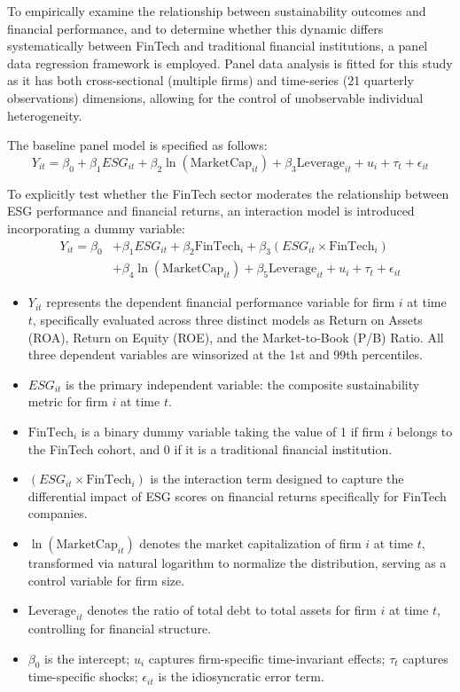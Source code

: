 \documentclass[12pt]{article}
\begin{document}
To empirically examine the relationship between sustainability outcomes and financial performance, and to determine whether this dynamic differs systematically between FinTech and traditional financial institutions, a panel data regression framework is employed. Panel data analysis is fitted for this study as it has both cross-sectional (multiple firms) and time-series (21 quarterly observations) dimensions, allowing for the control of unobservable individual heterogeneity.

The baseline panel model is specified as follows:
\begin{equation}
Y_{it} = \beta_0 + \beta_1 \textit{ESG}_{it} + \beta_2 \ln(\text{MarketCap}_{it}) + \beta_3 \text{Leverage}_{it} + u_i + \tau_t + \epsilon_{it}
\end{equation}

To explicitly test whether the FinTech sector moderates the relationship between ESG performance and financial returns, an interaction model is introduced incorporating a dummy variable:
\begin{equation}
\begin{split}
Y_{it} = \beta_0 &+ \beta_1 \textit{ESG}_{it} + \beta_2 \text{FinTech}_i + \beta_3 (\textit{ESG}_{it} \times \text{FinTech}_i) \\
&+ \beta_4 \ln(\text{MarketCap}_{it}) + \beta_5 \text{Leverage}_{it} + u_i + \tau_t + \epsilon_{it}
\end{split}
\end{equation}

\begin{itemize}
    \item $Y_{it}$ represents the dependent financial performance variable for firm $i$ at time $t$, specifically evaluated across three distinct models as Return on Assets (ROA), Return on Equity (ROE), and the Market-to-Book (P/B) Ratio. All three dependent variables are winsorized at the 1st and 99th percentiles.
    \item $\textit{ESG}_{it}$ is the primary independent variable: the composite sustainability metric for firm $i$ at time $t$.
    \item $\text{FinTech}_i$ is a binary dummy variable taking the value of 1 if firm $i$ belongs to the FinTech cohort, and 0 if it is a traditional financial institution.
    \item $(\textit{ESG}_{it} \times \text{FinTech}_i)$ is the interaction term designed to capture the differential impact of ESG scores on financial returns specifically for FinTech companies.
    \item $\ln(\text{MarketCap}_{it})$ denotes the market capitalization of firm $i$ at time $t$, transformed via natural logarithm to normalize the distribution, serving as a control variable for firm size.
    \item $\text{Leverage}_{it}$ denotes the ratio of total debt to total assets for firm $i$ at time $t$, controlling for financial structure.
    \item $\beta_0$ is the intercept; $u_i$ captures firm-specific time-invariant effects; $\tau_t$ captures time-specific shocks; $\epsilon_{it}$ is the idiosyncratic error term.
\end{itemize}
\end{document}
